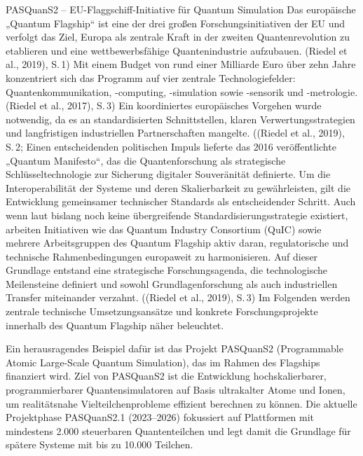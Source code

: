 PASQuanS2 – EU-Flaggschiff-Initiative für Quantum Simulation
Das europäische „Quantum Flagship“ ist eine der drei großen Forschungsinitiativen der EU und verfolgt das Ziel, Europa als zentrale Kraft in der zweiten Quantenrevolution zu etablieren und eine wettbewerbsfähige Quantenindustrie aufzubauen. \citealp[1]{} \cite{}(Riedel et al., 2019), S. 1) Mit einem Budget von rund einer Milliarde Euro über zehn Jahre konzentriert sich das Programm auf vier zentrale Technologiefelder: Quantenkommunikation, -computing, -simulation sowie -sensorik und -metrologie. \cite{}(Riedel et al., 2017), S. 3)
Ein koordiniertes europäisches Vorgehen wurde notwendig, da es an standardisierten Schnittstellen, klaren Verwertungsstrategien und langfristigen industriellen Partnerschaften mangelte. \cite{}((Riedel et al., 2019), S. 2; \citealp[2]{rasanenPathEuropeanQuantum2021} Einen entscheidenden politischen Impuls lieferte das 2016 veröffentlichte „Quantum Manifesto“, das die Quantenforschung als strategische Schlüsseltechnologie zur Sicherung digitaler Souveränität definierte. \citealp[1]{vandeventerEuropeanStandardsQuantum2022} Um die Interoperabilität der Systeme und deren Skalierbarkeit zu gewährleisten, gilt die Entwicklung gemeinsamer technischer Standards als entscheidender Schritt. Auch wenn laut \citealp[2]{vandeventerEuropeanStandardsQuantum2022} bislang noch keine übergreifende Standardisierungsstrategie existiert, arbeiten Initiativen wie das Quantum Industry Consortium (QuIC) sowie mehrere Arbeitsgruppen des Quantum Flagship aktiv daran, regulatorische und technische Rahmenbedingungen europaweit zu harmonisieren. Auf dieser Grundlage entstand eine strategische Forschungsagenda, die technologische Meilensteine definiert und sowohl Grundlagenforschung als auch industriellen Transfer miteinander verzahnt. \cite{}((Riedel et al., 2019), S. 3) Im Folgenden werden zentrale technische Umsetzungsansätze und konkrete Forschungsprojekte innerhalb des Quantum Flagship näher beleuchtet.

Ein herausragendes Beispiel dafür ist das Projekt PASQuanS2 (Programmable Atomic Large-Scale Quantum Simulation), das im Rahmen des Flagships finanziert wird. Ziel von PASQuanS2 ist die Entwicklung hochskalierbarer, programmierbarer Quantensimulatoren auf Basis ultrakalter Atome und Ionen, um realitätsnahe Vielteilchenprobleme effizient berechnen zu können. \citealp[6]{rasanenPathEuropeanQuantum2021} Die aktuelle Projektphase PASQuanS2.1 (2023–2026) fokussiert auf Plattformen mit mindestens 2.000 steuerbaren Quantenteilchen und legt damit die Grundlage für spätere Systeme mit bis zu 10.000 Teilchen. 

